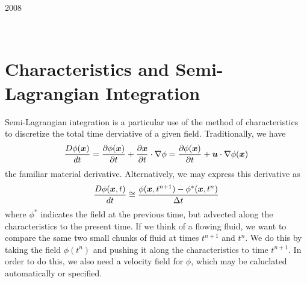 \documentclass[twoside,12pt]{../sty/report_petsc}
\newcommand{\sindex}[1]{\index{#1}}
\newcommand{\x}{\mbox{\boldmath \(x\)}}
\newcommand{\vu}{\mbox{\boldmath \(u\)}}
\begin{document}
{}{2008}

\newpage

\hbox{ }

\vspace{1in}
\date{\today}

\newpage

\chapter{Characteristics and Semi-Lagrangian Integration} 
\label{chapter_characteristics}
\sindex{characteristics}

    Semi-Lagrangian integration is a particular use of the method of characteristics to discretize the total time
derviative of a given field. Traditionally, we have
\begin{equation}
  {D\phi(\x) \over dt} = {\partial\phi(\x) \over \partial t} + {\partial\x \over \partial t} \cdot \nabla\phi
  = {\partial\phi(\x) \over \partial t} + \vu \cdot \nabla\phi(\x)
\end{equation}
the familiar material derivative. Alternatively, we may express this derivative as
\begin{equation}
  {D\phi(\x,t) \over dt} \cong {\phi(\x,t^{n+1}) - \phi^*(\x,t^n)\over \Delta t}
\end{equation}
where $\phi^*$ indicates the field at the previous time, but advected along the characteristics to the present time. If
we think of a flowing fluid, we want to compare the same two small chunks of fluid at times $t^{n+1}$ and $t^n$. We do
this by taking the field $\phi(t^n)$ and pushing it along the characteristics to time $t^{n+1}$. In order to do this, we
also need a velocity field for $\phi$, which may be caluclated automatically or specified.
\end{document}
